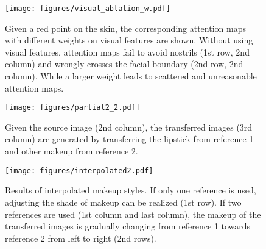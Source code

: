  \begin{figure}[!t]
    \texttt{[image: figures/visual\_ablation\_w.pdf]}
    \caption{Given a red point on the skin, the corresponding attention maps with different weights on visual features are shown. Without using visual features, attention maps fail to avoid nostrils (1st row, 2nd column) and wrongly crosses the facial boundary (2nd row, 2nd column). While a larger weight leads to scattered and unreasonable attention maps.}
    \label{ab2}
 \end{figure}

 \begin{figure}[!t]
    \texttt{[image: figures/partial2\_2.pdf]}
    \caption{Given the source image (2nd column), the transferred images (3rd column) are generated by transferring the lipstick from reference 1 and other makeup from reference 2. }
    \label{partial}
 \end{figure}

\begin{figure*}%
   \texttt{[image: figures/interpolated2.pdf]}
   \caption{Results of interpolated makeup styles. If only one reference is used, adjusting the shade of makeup can be realized (1st row). If two references are used (1st column and last column), the makeup of the transferred images is gradually changing from reference 1 towards reference 2 from left to right (2nd rows). }
   \label{interpolated}
   \vspace{-2mm}
\end{figure*}

